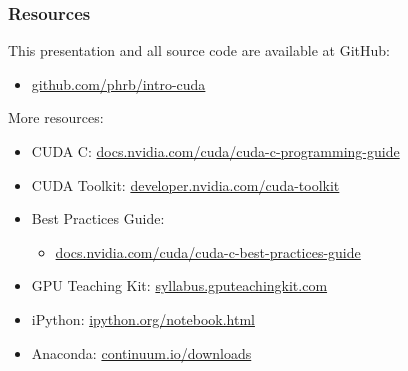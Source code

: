 \documentclass[10pt, compress]{beamer}
\begin{document}
\begin{frame}
    \frametitle{Resources}
    This presentation and all source code are available
    at \alert{GitHub}:

    \begin{itemize}
        \item \url{github.com/phrb/intro-cuda}
    \end{itemize}

    More resources:

    \begin{itemize}
        \item CUDA C: \url{docs.nvidia.com/cuda/cuda-c-programming-guide}
        \item CUDA Toolkit: \url{developer.nvidia.com/cuda-toolkit}
        \item Best Practices Guide:
            \begin{itemize}
                \item \url{docs.nvidia.com/cuda/cuda-c-best-practices-guide}
            \end{itemize}
        \item GPU Teaching Kit: \url{syllabus.gputeachingkit.com}
        \item iPython: \url{ipython.org/notebook.html}
        \item Anaconda: \url{continuum.io/downloads}
    \end{itemize}
\end{frame}

\maketitle
\end{document}
